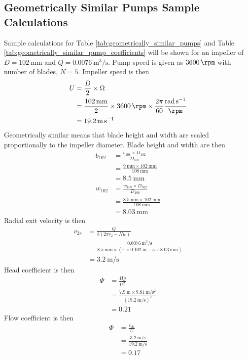 \subsection{Geometrically Similar Pumps Sample Calculations}
Sample calculations for Table \ref{tab:geometrically_similar_pumps} and Table \ref{tab:geometrically_similar_pump_coefficients} will be shown for an impeller of $D = \qty{102}{\milli\meter}$ and $Q = \qty{0.0076}{\meter\cubed\per\second}$. Pump speed is given as $\qty{3600}{\rpm}$ with number of blades, $N = 5$. Impeller speed is then
\begin{align*}
    U &= \frac{D}{2} \times \Omega \\
    &= \frac{\qty{102}{\milli\meter}}{2} \times \qty{3600}{\rpm} \times \frac{2\pi}{60} \frac{\unit{\radian\per\second}}{\unit{\rpm}} \\
    &= \qty{19.2}{\meter\per\second}
\end{align*}
Geometrically similar means that blade height and width are scaled proportionally to the impeller diameter. Blade height and width are then
\begin{align*}
    b_{102} &= \frac{b_{108} \times D_{102}}{D_{108}} \\
    &= \frac{\qty{9}{\milli\meter} \times \qty{102}{\milli\meter}}{\qty{108}{\milli\meter}} \\
    &= \qty{8.5}{\milli\meter} \\
    w_{102} &= \frac{w_{108} \times D_{102}}{D_{108}} \\
    &= \frac{\qty{8.5}{\milli\meter} \times \qty{102}{\milli\meter}}{\qty{108}{\milli\meter}} \\
    &= \qty{8.03}{\milli\meter}
\end{align*}
Radial exit velocity is then
\begin{align*}
    v_{2r} &= \frac{Q}{b(2\pi r_2 - Nw)} \\
    &= \frac{\qty{0.0076}{\meter\cubed\per\second}}{\qty{8.5}{\milli\meter} \times (\pi \times \qty{0.102}{\meter} - 5 \times \qty{8.03}{\milli\meter})} \\
    &= \qty{3.2}{\meter\per\second}
\end{align*}
Head coefficient is then
\begin{align*}
    \Psi &= \frac{Hg}{U^2} \\
    &= \frac{\qty{7.9}{\meter} \times \qty{9.81}{\meter\per\second\squared}}{(\qty{19.2}{\meter\per\second})^2} \\
    &= 0.21
\end{align*}
Flow coefficient is then
\begin{align*}
    \Phi &= \frac{v_{2r}}{U} \\
    &= \frac{\qty{3.2}{\meter\per\second}}{\qty{19.2}{\meter\per\second}} \\
    &= 0.17
\end{align*}

